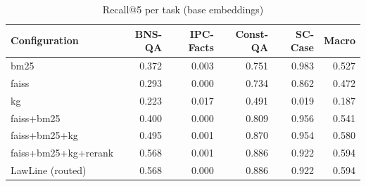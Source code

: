 \begin{table}
\caption{Recall@5 per task (base embeddings)}
\label{tab:per_task_base}
\begin{tabular}{lrrrrr}
\toprule
Configuration & BNS-QA & IPC-Facts & Const-QA & SC-Case & Macro \\
\midrule
bm25 & 0.372 & 0.003 & 0.751 & 0.983 & 0.527 \\
faiss & 0.293 & 0.000 & 0.734 & 0.862 & 0.472 \\
kg & 0.223 & 0.017 & 0.491 & 0.019 & 0.187 \\
faiss+bm25 & 0.400 & 0.000 & 0.809 & 0.956 & 0.541 \\
faiss+bm25+kg & 0.495 & 0.001 & 0.870 & 0.954 & 0.580 \\
faiss+bm25+kg+rerank & 0.568 & 0.001 & 0.886 & 0.922 & 0.594 \\
LawLine (routed) & 0.568 & 0.000 & 0.886 & 0.922 & 0.594 \\
\bottomrule
\end{tabular}
\end{table}

